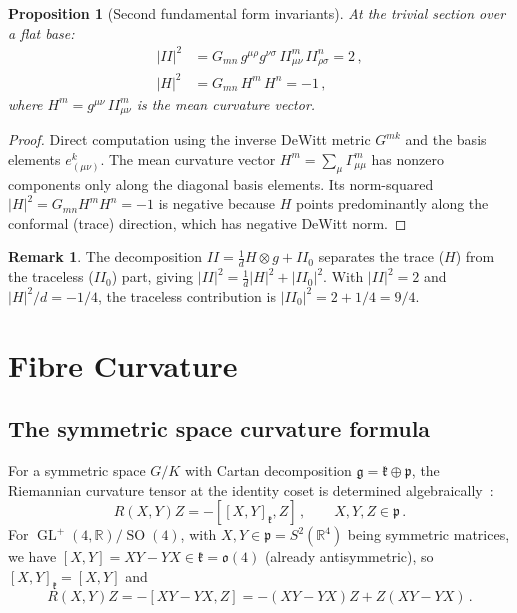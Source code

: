 \documentclass[12pt,a4paper]{article}
\newtheorem{proposition}[theorem]{Proposition}
\theoremstyle{definition}
\newtheorem{remark}[theorem]{Remark}
\newcommand{\GL}{\operatorname{GL}}
\newcommand{\SO}{\operatorname{SO}}
\newcommand{\R}{\mathbb{R}}
\begin{document}
\begin{proposition}[Second fundamental form invariants]
\label{prop:II}
At the trivial section over a flat base:
\begin{align}
|II|^2 &= G_{mn}\, g^{\mu\rho} g^{\nu\sigma}\, II^m_{\mu\nu}\, II^n_{\rho\sigma} = 2\,, \\
|H|^2 &= G_{mn}\, H^m\, H^n = -1\,,
\end{align}
where $H^m = g^{\mu\nu}\, II^m_{\mu\nu}$ is the mean curvature vector.
\end{proposition}

\begin{proof}
Direct computation using the inverse DeWitt metric $G^{mk}$ and the basis elements $e^k_{(\mu\nu)}$.
The mean curvature vector $H^m = \sum_\mu \Gamma^m_{\mu\mu}$ has nonzero components only along the diagonal basis elements.
Its norm-squared $|H|^2 = G_{mn} H^m H^n = -1$ is negative because $H$ points predominantly along the conformal (trace) direction, which has negative DeWitt norm.
\end{proof}

\begin{remark}
The decomposition $II = \frac{1}{d}H \otimes g + II_0$ separates the trace ($H$) from the traceless ($II_0$) part, giving $|II|^2 = \frac{1}{d}|H|^2 + |II_0|^2$.
With $|II|^2 = 2$ and $|H|^2/d = -1/4$, the traceless contribution is $|II_0|^2 = 2 + 1/4 = 9/4$.
\end{remark}


\section{Fibre Curvature}
\label{sec:fibre_curvature}

\subsection{The symmetric space curvature formula}

For a symmetric space $G/K$ with Cartan decomposition $\mathfrak{g} = \mathfrak{k} \oplus \mathfrak{p}$, the Riemannian curvature tensor at the identity coset is determined algebraically~\cite{Helgason1978}:
\begin{equation}
\label{eq:symspace_curvature}
R(X,Y)Z = -[[X,Y]_\mathfrak{k}, Z]\,,\qquad X, Y, Z \in \mathfrak{p}\,.
\end{equation}
For $\GL^+(4,\R)/\SO(4)$, with $X, Y \in \mathfrak{p} = S^2(\R^4)$ being symmetric matrices, we have $[X,Y] = XY - YX \in \mathfrak{k} = \mathfrak{o}(4)$ (already antisymmetric), so $[X,Y]_\mathfrak{k} = [X,Y]$ and
\begin{equation}
R(X,Y)Z = -[XY - YX, Z] = -(XY - YX)Z + Z(XY - YX)\,.
\end{equation}
\end{document}
